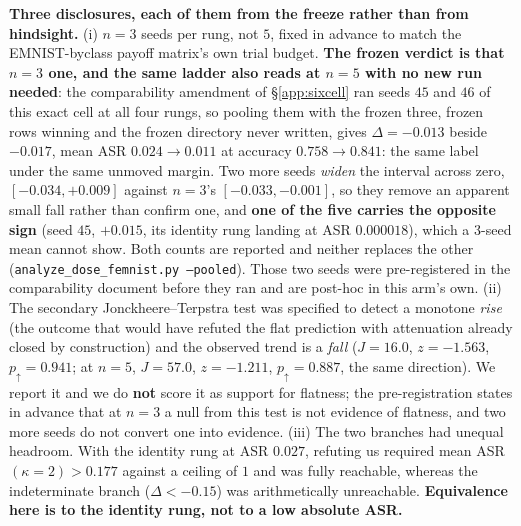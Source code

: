 \documentclass{article}
\begin{document}
\textbf{Three disclosures, each of them from the freeze rather than from hindsight.} (i) $n{=}3$ seeds per rung, not $5$, fixed in advance to match the EMNIST-byclass payoff matrix's own trial budget. \textbf{The frozen verdict is that $n{=}3$ one, and the same ladder also reads at $n{=}5$ with no new run needed}: the comparability amendment of §\ref{app:sixcell} ran seeds $45$ and $46$ of this exact cell at all four rungs, so pooling them with the frozen three, frozen rows winning and the frozen directory never written, gives $\Delta{=}{-}0.013$ beside $-0.017$, mean ASR $0.024 \to 0.011$ at accuracy $0.758 \to 0.841$: the same label under the same unmoved margin. Two more seeds \emph{widen} the interval across zero, $[-0.034,+0.009]$ against $n{=}3$'s $[-0.033,-0.001]$, so they remove an apparent small fall rather than confirm one, and \textbf{one of the five carries the opposite sign} (seed $45$, $+0.015$, its identity rung landing at ASR $0.000018$), which a 3-seed mean cannot show. Both counts are reported and neither replaces the other (\texttt{analyze\_dose\_femnist.py --pooled}). Those two seeds were pre-registered in the comparability document before they ran and are post-hoc in this arm's own. (ii) The secondary Jonckheere--Terpstra test was specified to detect a monotone \emph{rise} (the outcome that would have refuted the flat prediction with attenuation already closed by construction) and the observed trend is a \emph{fall} ($J{=}16.0$, $z{=}{-}1.563$, $p_{\uparrow}{=}0.941$; at $n{=}5$, $J{=}57.0$, $z{=}{-}1.211$, $p_{\uparrow}{=}0.887$, the same direction). We report it and we do \textbf{not} score it as support for flatness; the pre-registration states in advance that at $n{=}3$ a null from this test is not evidence of flatness, and two more seeds do not convert one into evidence. (iii) The two branches had unequal headroom. With the identity rung at ASR $0.027$, refuting us required mean ASR$(\kappa{=}2) > 0.177$ against a ceiling of $1$ and was fully reachable, whereas the indeterminate branch ($\Delta < -0.15$) was arithmetically unreachable. \textbf{Equivalence here is to the identity rung, not to a low absolute ASR.}
\end{document}
